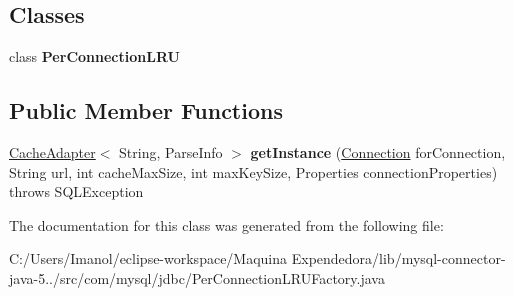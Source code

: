 \subsection*{Classes}
\begin{DoxyCompactItemize}
\item 
class {\bfseries Per\+Connection\+L\+RU}
\end{DoxyCompactItemize}
\subsection*{Public Member Functions}
\begin{DoxyCompactItemize}
\item 
\mbox{\label{classcom_1_1mysql_1_1jdbc_1_1_per_connection_l_r_u_factory_aa461de7842595245b0448853949542d7}} 
\mbox{\hyperlink{interfacecom_1_1mysql_1_1jdbc_1_1_cache_adapter}{Cache\+Adapter}}$<$ String, Parse\+Info $>$ {\bfseries get\+Instance} (\mbox{\hyperlink{interfacecom_1_1mysql_1_1jdbc_1_1_connection}{Connection}} for\+Connection, String url, int cache\+Max\+Size, int max\+Key\+Size, Properties connection\+Properties)  throws S\+Q\+L\+Exception 
\end{DoxyCompactItemize}


The documentation for this class was generated from the following file\+:\begin{DoxyCompactItemize}
\item 
C\+:/\+Users/\+Imanol/eclipse-\/workspace/\+Maquina Expendedora/lib/mysql-\/connector-\/java-\/5../src/com/mysql/jdbc/Per\+Connection\+L\+R\+U\+Factory.\+java\end{DoxyCompactItemize}
